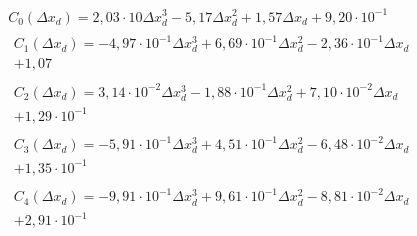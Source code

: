 \begin{eqnarray}
&C_0(\Delta x_d) =2,03\cdot 10\Delta x_d^{3}-5,17\Delta x_d^{2}+1,57\Delta x_d+9,20\cdot 10^{-1} \\                                
&\begin{split}C_1(\Delta x_d) =-4,97\cdot 10^{-1}\Delta x_d^{3}+6,69\cdot 10^{-1}\Delta x_d^{2}-2,36\cdot 10^{-1}\Delta x_d\\+1,07 \end{split}\\             
&\begin{split}C_2(\Delta x_d) =3,14\cdot 10^{-2}\Delta x_d^{3}-1,88\cdot 10^{-1}\Delta x_d^{2}+7,10\cdot 10^{-2}\Delta x_d\\+1,29\cdot 10^{-1} \end{split}\\ 
&\begin{split}C_3(\Delta x_d) =-5,91\cdot 10^{-1}\Delta x_d^{3}+4,51\cdot 10^{-1}\Delta x_d^{2}-6,48\cdot 10^{-2}\Delta x_d\\+1,35\cdot 10^{-1} \end{split}\\
&\begin{split}C_4(\Delta x_d) =-9,91\cdot 10^{-1}\Delta x_d^{3}+9,61\cdot 10^{-1}\Delta x_d^{2}-8,81\cdot 10^{-2}\Delta x_d\\+2,91\cdot 10^{-1}\end{split}
\end{eqnarray}

